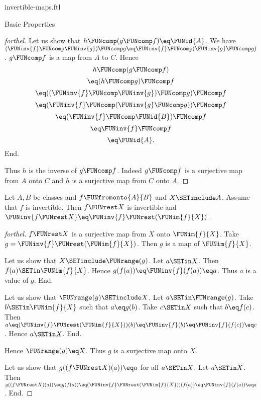 \documentclass{stex}
\begin{document}
\begin{smodule}{invertible-maps.ftl}
\begin{sfragment}{Basic Properties}
\begin{proof}[forthel]
    Let us show that $h \FUNcomp (g \FUNcomp f) \eq \FUNid{A}$.
      We have $(\FUNinv{f} \FUNcomp \FUNinv{g}) \FUNcomp g \eq \FUNinv{f} \FUNcomp (\FUNinv{g} \FUNcomp g)$.
      $g \FUNcomp f$ is a map from $A$ to $C$.
      Hence
      \[  h \FUNcomp (g \FUNcomp f)                           \]
      \[    \eq (h \FUNcomp g) \FUNcomp f                       \]
      \[    \eq ((\FUNinv{f} \FUNcomp \FUNinv{g}) \FUNcomp g) \FUNcomp f   \]
      \[    \eq (\FUNinv{f} \FUNcomp (\FUNinv{g} \FUNcomp g)) \FUNcomp f   \]
      \[    \eq (\FUNinv{f} \FUNcomp \FUNid{B}) \FUNcomp f            \]
      \[    \eq \FUNinv{f} \FUNcomp f                            \]
      \[    \eq \FUNid{A}.                                  \]
    End.

    Thus $h$ is the inverse of $g \FUNcomp f$.
    Indeed $g \FUNcomp f$ is a surjective map from $A$ onto $C$ and $h$ is a surjective map from $C$ onto $A$.
  \end{proof}

  \begin{proposition}[forthel,id=FOUNDATIONS_09_6374884963778560]
    Let $A, B$ be classes and $f \FUNfromonto{A}{B}$ and $X \SETinclude A$.
    Assume that $f$ is invertible.
    Then $f \FUNrest X$ is invertible and $\FUNinv{f\FUNrest X} \eq \FUNinv{f} \FUNrest (\FUNim{f}{X})$.
  \end{proposition}
  \begin{proof}[forthel]
    $f \FUNrest X$ is a surjective map from $X$ onto $\FUNim{f}{X}$.
    Take $g = \FUNinv{f} \FUNrest (\FUNim{f}{X})$.
    Then $g$ is a map of $\FUNim{f}{X}$.

    Let us show that $X \SETinclude \FUNrange(g)$.
      Let $a \SETin X$.
      Then $f(a) \SETin \FUNim{f}{X}$.
      Hence $g(f(a)) \eq \FUNinv{f}(f(a)) \eq a$.
      Thus $a$ is a value of $g$.
    End.

    Let us show that $\FUNrange(g) \SETinclude X$.
      Let $a \SETin \FUNrange(g)$.
      Take $b \SETin \FUNim{f}{X}$ such that $a \eq g(b)$.
      Take $c \SETin X$ such that $b \eq f(c)$.
      Then $a
        \eq (\FUNinv{f} \FUNrest (\FUNim{f}{X}))(b)
        \eq \FUNinv{f}(b)
        \eq \FUNinv{f}(f(c))
        \eq c$.
      Hence $a \SETin X$.
    End.

    Hence $\FUNrange(g) \eq X$.
    Thus $g$ is a surjective map onto $X$.

    Let us show that $g((f \FUNrest X)(a)) \eq a$ for all $a \SETin X$.
      Let $a \SETin X$.
      Then $g((f \FUNrest X)(a))
        \eq g(f(a))
        \eq (\FUNinv{f} \FUNrest (\FUNim{f}{X}))(f(a))
        \eq \FUNinv{f}(f(a))
        \eq a$.
    End.


\end{proof}
\end{sfragment}
\end{smodule}
\end{document}
